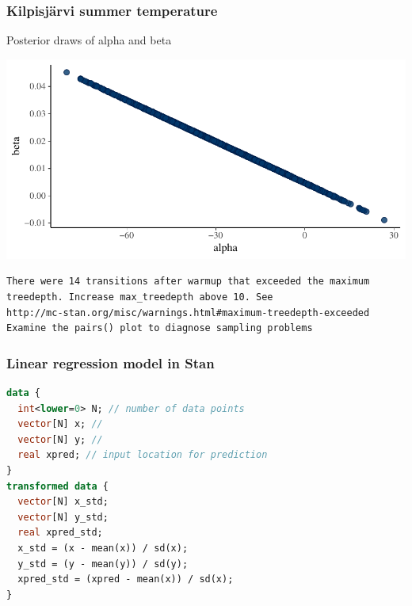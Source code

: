 \documentclass[10pt]{beamer}
\begin{document}
\begin{frame}[fragile]

\frametitle{Kilpisjärvi summer temperature}

  Posterior draws of alpha and beta

  \begin{center}
    \includegraphics[width=18cm]{figs/kilpis_lin_mcmc_scatter.pdf}
  \end{center}

{\scriptsize
\begin{lstlisting}
There were 14 transitions after warmup that exceeded the maximum
treedepth. Increase max_treedepth above 10. See
http://mc-stan.org/misc/warnings.html#maximum-treedepth-exceeded
Examine the pairs() plot to diagnose sampling problems
\end{lstlisting}
}

\end{frame}

\begin{frame}[fragile]

\frametitle{Linear regression model in Stan}

  {\scriptsize
\begin{lstlisting}[language=Stan]
data {
  int<lower=0> N; // number of data points
  vector[N] x; //
  vector[N] y; //
  real xpred; // input location for prediction
}
transformed data {
  vector[N] x_std;
  vector[N] y_std;
  real xpred_std;
  x_std = (x - mean(x)) / sd(x);
  y_std = (y - mean(y)) / sd(y);
  xpred_std = (xpred - mean(x)) / sd(x);
}
\end{lstlisting}
  }
\end{frame}

\end{document}
